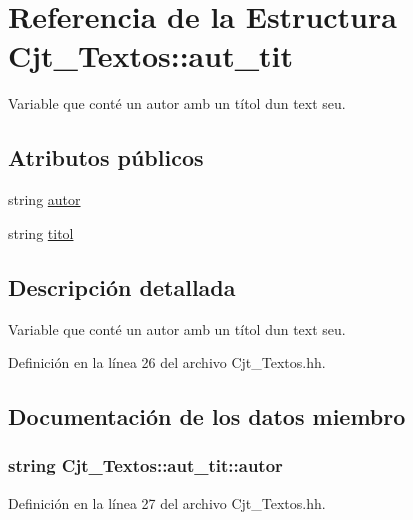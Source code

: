 \hypertarget{struct_cjt___textos_1_1aut__tit}{}\section{Referencia de la Estructura Cjt\+\_\+\+Textos\+:\+:aut\+\_\+tit}
\label{struct_cjt___textos_1_1aut__tit}


Variable que conté un autor amb un títol d\textquotesingle{}un text seu.  


\subsection*{Atributos públicos}
\begin{DoxyCompactItemize}
\item 
string \hyperlink{struct_cjt___textos_1_1aut__tit_a3fcf55e30c5b82010aa74f51ca882ba3}{autor}
\item 
string \hyperlink{struct_cjt___textos_1_1aut__tit_a4d7d3796333130213bcbe0ba9cd4ec83}{titol}
\end{DoxyCompactItemize}


\subsection{Descripción detallada}
Variable que conté un autor amb un títol d\textquotesingle{}un text seu. 

Definición en la línea 26 del archivo Cjt\+\_\+\+Textos.\+hh.



\subsection{Documentación de los datos miembro}
\subsubsection[{\texorpdfstring{autor}{autor}}]{\setlength{\rightskip}{0pt plus 5cm}string Cjt\+\_\+\+Textos\+::aut\+\_\+tit\+::autor}\hypertarget{struct_cjt___textos_1_1aut__tit_a3fcf55e30c5b82010aa74f51ca882ba3}{}\label{struct_cjt___textos_1_1aut__tit_a3fcf55e30c5b82010aa74f51ca882ba3}


Definición en la línea 27 del archivo Cjt\+\_\+\+Textos.\+hh.

